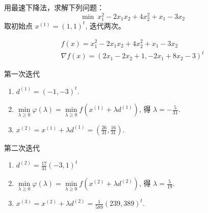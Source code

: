 \begin{Problem}
    用最速下降法，求解下列问题：
    \[
        \min \ x_1^2 - 2x_1x_2 + 4x_2^2 + x_1 - 3x_2
    \]
    取初始点 $x^{(1)} = (1, 1)^t$, 迭代两次。

    \Answer 
    \begin{gather*}
        f(x) = x_1^2 - 2x_1x_2 + 4x_2^2 + x_1 - 3x_2\\
        \nabla f(x) = (2x_1 - 2x_2 + 1, -2x_1 + 8x_2 - 3)^t
    \end{gather*}
    
    第一次迭代 
    \begin{enumerate}[label={(\arabic*)}]
        \item $d^{(1)} = (-1, -3)^t$.
        \item $\underset{\lambda \ge 0}{\min} \varphi(\lambda) = \underset{\lambda \ge 0}{\min}f(x^{(1)} + \lambda d^{(1)})$, 得 $\lambda = -\frac{5}{31}$.
        \item $x^{(2)} = x^{(1)} + \lambda d^{(1)} = (\frac{26}{31}, \frac{16}{31})$.
    \end{enumerate}

    第二次迭代
    \begin{enumerate}[label={(\arabic*)}]
        \item $d^{(2)} = \frac{17}{31}(-3, 1)^t$
        \item $\underset{\lambda \ge 0}{\min} \varphi(\lambda) = \underset{\lambda \ge 0}{\min}f(x^{(2)} + \lambda d^{(2)})$, 得 $\lambda = \frac{5}{19}$.
        \item $x^{(3)} = x^{(2)} + \lambda d^{(2)} = \frac{1}{589}(239, 389)^t$. 
    \end{enumerate}
\end{Problem}

